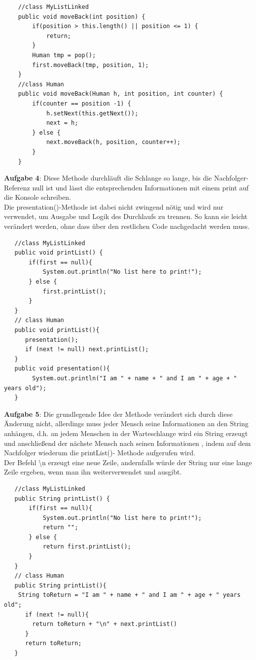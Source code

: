 \documentclass{article}
\begin{document}
\begin{verbatim}
    //class MyListLinked
    public void moveBack(int position) {
        if(position > this.length() || position <= 1) {
            return;
        }
        Human tmp = pop();
        first.moveBack(tmp, position, 1);
    }
    //class Human 
    public void moveBack(Human h, int position, int counter) {
        if(counter == position -1) {
            h.setNext(this.getNext());
            next = h;
        } else {
            next.moveBack(h, position, counter++);
        }
    }
\end{verbatim}
\textbf{Aufgabe 4}:
Diese Methode durchläuft die Schlange so lange, bis die Nachfolger-Referenz null ist und 
lässt die entsprechenden Informationen mit einem print auf die Konsole schreiben. \\
Die presentation()-Methode ist dabei nicht zwingend nötig und wird nur verwendet, um Ausgabe 
und Logik des Durchlaufs zu trennen. So kann sie leicht verändert werden, ohne dass über den restlichen Code 
nachgedacht werden muss. 
\begin{verbatim}
   //class MyListLinked
   public void printList() {
       if(first == null){
           System.out.println("No list here to print!");
       } else {
           first.printList();
       }
   }
   // class Human 
   public void printList(){
      presentation();
      if (next != null) next.printList();
   }
   public void presentation(){
        System.out.println("I am " + name + " and I am " + age + " years old");
   }
\end{verbatim}
\textbf{Aufgabe 5}:
Die grundlegende Idee der Methode verändert sich durch diese Änderung nicht, allerdings 
muss jeder Mensch seine Informationen an den String anhängen, d.h. an jedem Menschen 
in der Warteschlange wird ein String erzeugt und anschließend der nächste Mensch 
nach seinen Informationen , indem auf dem Nachfolger wiederum die printList()-
Methode aufgerufen wird. \\
Der Befehl \textbackslash n erzeugt eine neue Zeile, andernfalls würde der String nur eine lange
Zeile ergeben, wenn man ihn weiterverwendet und ausgibt. 
\begin{verbatim}
   //class MyListLinked
   public String printList() {
       if(first == null){
           System.out.println("No list here to print!");
           return "";
       } else {
           return first.printList();
       }
   }
   // class Human 
   public String printList(){
    String toReturn = "I am " + name + " and I am " + age + " years old";
      if (next != null){
        return toReturn + "\n" + next.printList()
      } 
      return toReturn;
   }

\end{verbatim}
\end{document}
